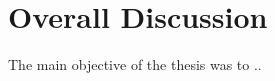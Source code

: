 \chapter{Overall Discussion}
\label{chap:discussion}
The main objective of the thesis was to .. \cite{Schwab2013}
